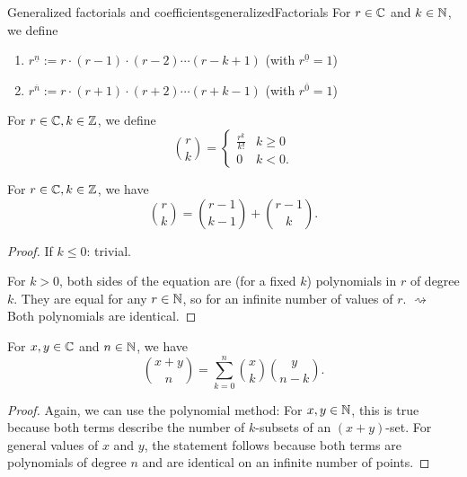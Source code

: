 \documentclass[language=english]{../../Template/TemplateLecture}
\begin{document}
\begin{defi}{Generalized factorials and coefficients}{generalizedFactorials}
    For $r \in \mathbb{C}$ and $k \in \mathbb{N}$, we define 
    \begin{enumerate}[$(i)$]
        \item $r^{\underline{n}} := r \cdot (r-1) \cdot (r-2) \cdots (r-k+1)$ (with $r^{\underline{0}} = 1$)
        \item $r^{\overline{n}} := r \cdot (r+1) \cdot (r+2) \cdots (r+k-1)$ (with $r^{\overline{0}} = 1$)
    \end{enumerate}

    For $r \in \mathbb{C}, k \in \mathbb{Z}$, we define 
    \begin{equation}
        \binom{r}{k} = \begin{cases}
            \frac{r^{\underline{k}}}{k!} & k \geq 0 \\
            0 & k < 0.
        \end{cases}
    \end{equation}
\end{defi}

\begin{prop}
    For $r \in \mathbb{C}, k \in \mathbb{Z}$, we have
    \begin{equation}
        \binom{r}{k} = \binom{r-1}{k-1} + \binom{r-1}{k}.
    \end{equation}
\end{prop}

\begin{proof}
    If $k \leq 0$: trivial.

    For $k > 0$, both sides of the equation are (for a fixed $k$) polynomials in $r$ of degree $k$. They are equal for any $r \in \mathbb{N}$, so for an infinite number of values of $r$. $\rightsquigarrow$ Both polynomials are identical.
\end{proof}



\begin{prop}
    For $x, y \in \mathbb{C}$ and $n \in \mathbb{N}$, we have 
    \begin{equation}
        \binom{x + y}{n} = \sum_{k = 0}^n \binom{x}{k} \binom{y}{n-k}.
    \end{equation}
\end{prop}
\begin{proof}
    Again, we can use the polynomial method: For $x, y \in \mathbb{N}$, this is true because both terms describe the number of $k$-subsets of an $(x + y)$-set. For general values of $x$ and $y$, the statement follows because both terms are polynomials of degree $n$ and are identical on an infinite number of points.
\end{proof}
\end{document}
